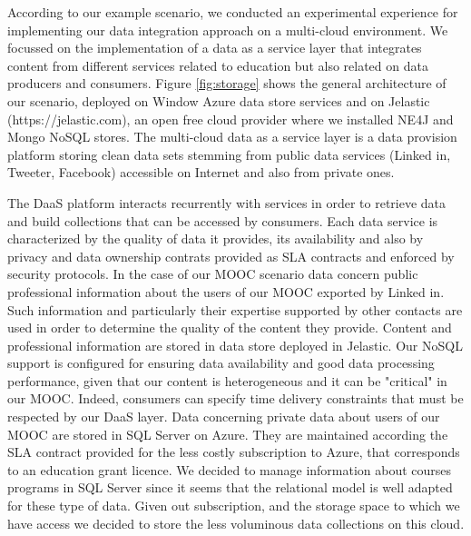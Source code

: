 \begin{figure}
\end{figure}

According to our example scenario, we conducted an experimental experience for implementing our data integration approach on a multi-cloud environment. We focussed on the implementation of a data as a service layer that integrates content from different services related to education but also related on data producers and consumers. Figure \ref{fig:storage} shows the general architecture of our scenario, deployed on Window Azure data store services and on Jelastic (https://jelastic.com), an open free cloud provider where we installed NE4J and Mongo NoSQL stores. The multi-cloud data as a service layer is a data provision platform storing clean data sets stemming from public data services (Linked in, Tweeter, Facebook) accessible on Internet and also from private ones. 

The DaaS platform interacts recurrently with services in order to retrieve data and build collections that can be accessed by consumers. Each data service is characterized by the quality of data it provides, its availability and also by privacy and data ownership contrats provided as SLA contracts and enforced by security protocols. In the case of our MOOC scenario data concern public professional information about the users of our MOOC exported by Linked in. Such information and particularly their expertise supported by other contacts are used in order to determine the quality of the content they provide. Content and professional information are stored in data store deployed in Jelastic.  Our NoSQL support is configured for ensuring data availability and good data processing performance, given that our content is heterogeneous and it can be "critical" in our MOOC. Indeed, consumers can specify time delivery constraints that must be respected by our DaaS layer. Data concerning private data about users of our MOOC are stored in SQL Server on Azure. They are maintained according the  SLA contract provided for the less costly subscription to Azure, that corresponds to an education grant licence. We decided to manage information about courses programs in SQL Server since it seems that the relational model is well adapted for these type of data. Given out subscription, and the storage space to which we have access we decided to store the less voluminous data collections on this cloud. 
